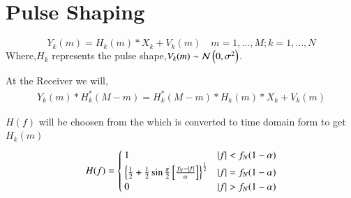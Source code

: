\documentclass[journal,12pt,twocolumn]{IEEEtran}
\begin{document}
\section{Pulse Shaping}
\begin{equation}
Y_k(m)=H_k(m) \ast X_k + V_k(m) \quad m=1,\dots, M; k=1,\dots,N
\end{equation}
Where,$H_k$ represents the pulse shape,$V_k(m) \sim \mathcal{N}\left(0,\sigma^2\right) $.

At the Receiver we will,
\begin{align}
Y_k(m)\ast H^*_k(M-m) =H^*_k(M-m)\ast H_k(m) \ast X_k + V_k(m) 
\end{align}

$H(f)$ will be choosen from the \cite{dvb} which is converted to time domain form to get $ H_k(m)$
\begin{align}
H(f) =\begin{cases}
1& \left\vert f\right\vert<f_N(1-\alpha)\\
\left\{\frac{1}{2}+\frac{1}{2}\sin \frac{\pi}{2}{}\left[\frac{f_N-\left\vert f\right\vert}{\alpha}\right]\right\}^{\frac{1}{2}}&\left\vert f\right\vert=f_N(1-\alpha)\\
0&\left\vert f\right\vert>f_N(1-\alpha)
\end{cases}
\end{align}
%


\end{document}
